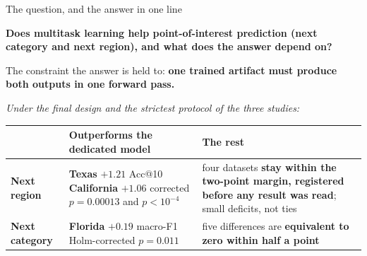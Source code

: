 \documentclass{beamer}
\begin{document}
\begin{frame}{The question, and the answer in one line}
    \begin{block}{}
        \textbf{Does multitask learning help point-of-interest prediction (next category and next
        region), and what does the answer depend on?}
    \end{block}

    \smallskip
    {\small The constraint the answer is held to: \textbf{one trained artifact must produce both
    outputs in one forward pass.}\par}

    \smallskip
    {\small\itshape Under the final design and the strictest protocol of the three studies:\par}

    \medskip
    {\footnotesize
    \setlength{\tabcolsep}{6pt}
    \renewcommand{\arraystretch}{1.3}\begin{tabular}{@{}p{2.1cm} p{5.0cm} p{6.3cm}@{}}
        \toprule
         & \textbf{\color{primaryshade}Outperforms} the dedicated model
         & \textbf{The rest} \\
        \midrule
        \textbf{Next region}
            & \raggedright \textbf{Texas} $+1.21$ Acc@10\newline
              \textbf{California} $+1.06$\newline
              {\scriptsize corrected $p = 0.00013$ and $p < 10^{-4}$}
            & \raggedright four datasets \textbf{stay within the two-point margin, registered
              before any result was read}; small \alert{deficits, not ties} \tabularnewline
        \addlinespace
        \textbf{Next category}
            & \raggedright \textbf{Florida} $+0.19$ macro-F1\newline
              {\scriptsize Holm-corrected $p = 0.011$}
            & \raggedright five differences are \textbf{equivalent to zero within half a point}
              \tabularnewline
        \bottomrule
    \end{tabular}\par}
\end{frame}
\end{document}
